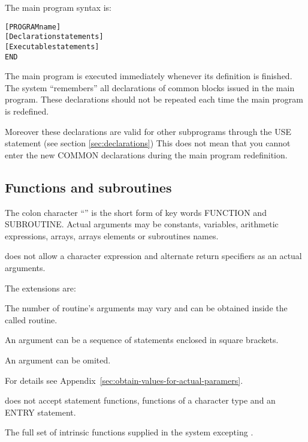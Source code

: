 The \COMIS{} main program syntax is:

\begin{alltt}
   [PROGRAM name]
   [Declaration statements]
   [Executable statements]
   END
\end{alltt}
 
The main program is executed immediately whenever its
definition is finished. The \COMIS{} system ``remembers''
all declarations of common blocks issued in the main
program. These declarations should not be repeated
each time the main program is redefined.
 
Moreover these declarations are valid for other
subprograms through the USE statement 
(see section \ref{sec:declarations})
This does not mean that you cannot enter the new COMMON 
declarations during the main program redefinition.

\subsection{Functions and subroutines}
\index{\Colon}
 
The colon character ``\Colon'' is the short form of key words FUNCTION and SUBROUTINE.
%
Actual arguments may be constants, variables, arithmetic
expressions, arrays, arrays elements or subroutines names.

\COMIS{} does not allow a character expression and
alternate return specifiers as an actual arguments.
 
The \COMIS{} extensions are:

\begin{UL}
\item The number of routine's arguments may vary and
      can be obtained inside the called routine.
\item An argument can be a sequence of statements enclosed in
      square brackets.
\item An argument can be omited.
\end{UL}

For details see Appendix~\ref{sec:obtain-values-for-actual-paramers}.
 
\COMIS{} does not accept statement functions, functions
of a character type and an ENTRY statement.
 
The full set of intrinsic functions supplied in the \COMIS{} system
excepting .
